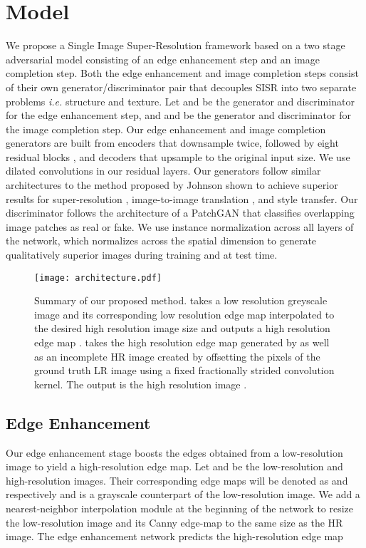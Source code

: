 \documentclass[10pt,twocolumn,letterpaper]{article}
\begin{document}
\section{Model}
We propose a Single Image Super-Resolution framework based on a two stage adversarial model \cite{goodfellow2014generative} consisting of an edge enhancement step and an image completion step. Both the edge enhancement and image completion steps consist of their own generator/discriminator pair that decouples SISR into two separate problems \textit{i.e.} structure and texture. Let  and  be the generator and discriminator for the edge enhancement step, and  and  be the generator and discriminator for the image completion step. Our edge enhancement and image completion generators are built from encoders that downsample twice, followed by eight residual blocks \cite{he2016deep}, and decoders that upsample to the original input size. We use dilated convolutions in our residual layers. 
Our generators follow similar architectures to the method proposed by Johnson \etal \cite{johnson2016perceptual} shown to achieve superior results for super-resolution \cite{sajjadi2017enhancenet, gondal2018unreasonable}, image-to-image translation \cite{zhu2017unpaired}, and style transfer. Our discriminator follows the architecture of a  PatchGAN \cite{isola2017image, zhu2017unpaired} that classifies overlapping  image patches as real or fake. We use instance normalization \cite{ulyanov2017improved} across all layers of the network, which normalizes across the spatial dimension to generate qualitatively superior images during training and at test time. 

\begin{figure*}
	\centering
	\texttt{[image: architecture.pdf]}
	\caption{Summary of our proposed method.  takes a low resolution greyscale image  and its corresponding low resolution edge map  interpolated to the desired high resolution image size and outputs a high resolution edge map .  takes the high resolution edge map generated by  as well as an incomplete HR image  created by offsetting the pixels of the ground truth LR image using a fixed fractionally strided convolution kernel. The output is the high resolution image .}
	\label{seq3}
\end{figure*}

\subsection{Edge Enhancement}
Our edge enhancement stage boosts the edges obtained from a low-resolution image to yield a high-resolution edge map. Let  and  be the low-resolution and high-resolution images. Their corresponding edge maps will be denoted as  and  respectively and  is a grayscale counterpart of the low-resolution image. We add a nearest-neighbor interpolation module at the beginning of the network to resize the low-resolution image and its Canny edge-map to the same size as the HR image. The edge enhancement network  predicts the high-resolution edge map
\end{document}
